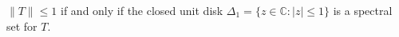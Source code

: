 $\|T\| \leq 1$ if and only if the closed unit disk $\Delta_1 = \{z \in \mathbb{C} : |z| \leq 1\}$ is a spectral set for $T$.
